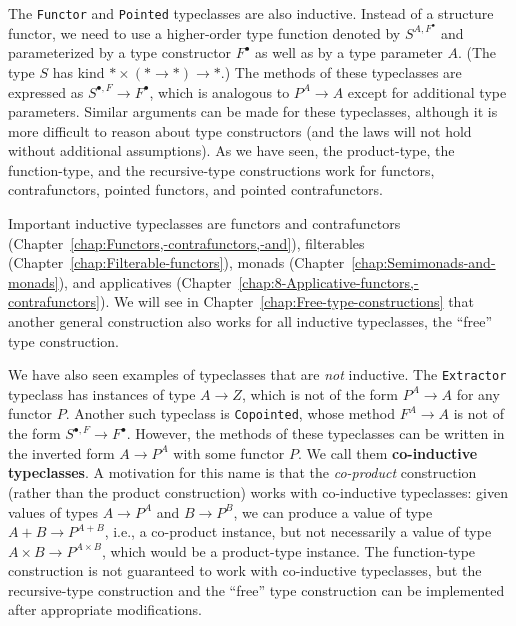 The \lstinline!Functor! and \lstinline!Pointed! typeclasses are
also inductive. Instead of a structure functor, we need to use a higher-order
type function denoted by $S^{A,F^{\bullet}}$ and parameterized by
a type constructor $F^{\bullet}$ as well as by a type parameter $A$.
(The type $S$ has kind $*\times(*\rightarrow*)\rightarrow*$.) The
methods of these typeclasses are expressed as $S^{\bullet,F}\rightarrow F^{\bullet}$,
which is analogous to $P^{A}\rightarrow A$ except for additional
type parameters. Similar arguments can be made for these typeclasses,
although it is more difficult to reason about type constructors (and
the laws will not hold without additional assumptions). As we have
seen, the product-type, the function-type, and the recursive-type
constructions work for functors, contrafunctors, pointed functors,
and pointed contrafunctors.

Important inductive typeclasses are functors and contrafunctors (Chapter~\ref{chap:Functors,-contrafunctors,-and}),
filterables (Chapter~\ref{chap:Filterable-functors}), monads (Chapter~\ref{chap:Semimonads-and-monads}),
and applicatives (Chapter~\ref{chap:8-Applicative-functors,-contrafunctors}).
We will see in Chapter~\ref{chap:Free-type-constructions} that another
general construction also works for all inductive typeclasses, \textemdash{}
the \textsf{``}free\textsf{''} type construction.

We have also seen examples of typeclasses that are \emph{not} inductive.
The \lstinline!Extractor! typeclass has instances of type $A\rightarrow Z$,
which is not of the form $P^{A}\rightarrow A$ for any functor $P$.
Another such typeclass is \lstinline!Copointed!, whose method $F^{A}\rightarrow A$
is not of the form $S^{\bullet,F}\rightarrow F^{\bullet}$. However,
the methods of these typeclasses can be written in the inverted form
$A\rightarrow P^{A}$ with some functor $P$. We call them \textbf{co-inductive}
\textbf{typeclasses}. A motivation
for this name is that the \emph{co-product} construction (rather than
the product construction) works with co-inductive typeclasses: given
values of types $A\rightarrow P^{A}$ and $B\rightarrow P^{B}$, we
can produce a value of type $A+B\rightarrow P^{A+B}$, i.e., a co-product
instance, but not necessarily a value of type $A\times B\rightarrow P^{A\times B}$,
which would be a product-type instance. The function-type construction
is not guaranteed to work with co-inductive typeclasses, but the recursive-type
construction and the \textsf{``}free\textsf{''} type construction can be implemented
after appropriate modifications.


